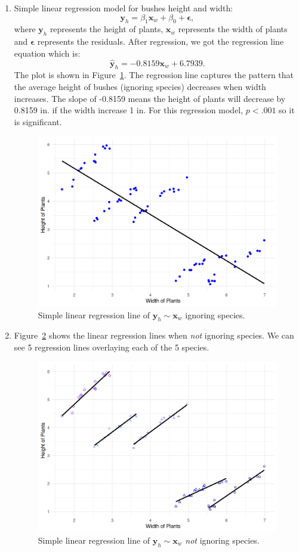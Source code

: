 \documentclass[12pt]{article}
\begin{document}
\begin{enumerate}

\item Simple linear regression model for bushes height and width:
\[
\mathbf{y}_{h} = \beta_1\mathbf{x}_w + \beta_0 + \mathbf{\epsilon} ,\] 
where $\mathbf{y}_h$ represents the height of plants, $\mathbf{x}_w$ represents the width of plants and $\mathbf{\epsilon}$ represents the residuals. After regression, we got the regression line equation which is:
\[
\hat{ \mathbf{y} }_{h} = -0.8159\mathbf{x}_w + 6.7939
.\] 
The plot is shown in Figure~\ref{Fig:3}. The regression line captures the pattern that the average height of bushes (ignoring species) decreases when width increases. The slope of -0.8159 means the height of plants will decrease by 0.8159 in. if the width increase 1 in. For this regression model, $p < .001$ so it is significant.

\begin{figure}[htbp]
\includegraphics[width=.7\textwidth]{3.png}
\centering
\caption{Simple linear regression line of $\mathbf{y}_h \sim \mathbf{x}_w$ ignoring species.}
\label{Fig:3}
\end{figure}

\item Figure~\ref{Fig:4} shows the linear regression lines when {\em not} ignoring species. We can see 5 regression lines overlaying each of the 5 species.

\begin{figure}[htbp]
\includegraphics[width=.7\textwidth]{4.png}
\centering
\caption{Simple linear regression line of $\mathbf{y}_h \sim \mathbf{x}_w$ {\em not }ignoring species.}
\label{Fig:4}
\end{figure}


\end{enumerate}
\end{document}
